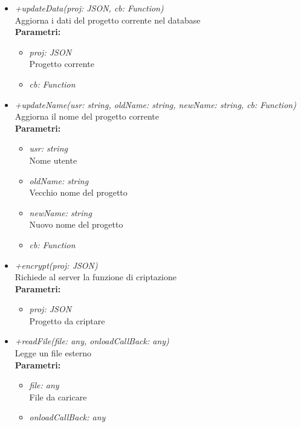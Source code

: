 \begin{itemize}
\begin{itemize}
\begin{itemize}
    		\end{itemize}
    		\item \emph{+updateData(proj: JSON, cb: Function)}\\
    		Aggiorna i dati del progetto corrente nel database\\
    		\textbf{Parametri:}
    		\begin{itemize}
    			\item \emph{proj: JSON}\\
    			Progetto corrente
    			\item \emph{cb: Function}\\
    			
    		\end{itemize}
    		\item \emph{+updateName(usr: string, oldName: string, newName: string, cb: Function)}\\
    		Aggiorna il nome del progetto corrente\\
    		\textbf{Parametri:}
    		\begin{itemize}
    			\item \emph{usr: string}\\
    			Nome utente
    			\item \emph{oldName: string}\\
    			Vecchio nome del progetto
    			\item \emph{newName: string}\\
    			Nuovo nome del progetto
    			\item \emph{cb: Function}\\
    			
    		\end{itemize}
    		\item \emph{+encrypt(proj: JSON)}\\
    		Richiede al server la funzione di criptazione\\
    		\textbf{Parametri:}
    		\begin{itemize}
    			\item \emph{proj: JSON}\\
    			Progetto da criptare
    		\end{itemize}
    		\item \emph{+readFile(file: any, onloadCallBack: any)}\\
    		Legge un file esterno\\
    		\textbf{Parametri:}
    		\begin{itemize}
    			\item \emph{file: any}\\
    			File da caricare
    			\item \emph{onloadCallBack: any}\\
    			

\end{itemize}
\end{itemize}
\end{itemize}
